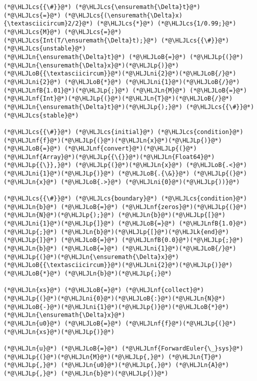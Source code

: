 \documentclass[12pt,a4paper]{article}
\newcommand{\HLJLk}[1]{\textcolor[RGB]{148,91,176}{\textbf{#1}}}
\newcommand{\HLJLn}[1]{#1}
\newcommand{\HLJLnf}[1]{\textcolor[RGB]{66,102,213}{#1}}
\newcommand{\HLJLnfB}[1]{\textcolor[RGB]{59,151,46}{#1}}
\newcommand{\HLJLni}[1]{\textcolor[RGB]{59,151,46}{#1}}
\newcommand{\HLJLoB}[1]{\textcolor[RGB]{102,102,102}{\textbf{#1}}}
\newcommand{\HLJLp}[1]{#1}
\newcommand{\HLJLcs}[1]{\textcolor[RGB]{153,153,119}{\textit{#1}}}
\begin{document}
\begin{lstlisting}
(*@\HLJLcs{{\#}}@*) (*@\HLJLcs{\ensuremath{\Delta}t}@*) (*@\HLJLcs{=}@*) (*@\HLJLcs{(\ensuremath{\Delta}x){\textasciicircum}2/2}@*) (*@\HLJLcs{*}@*) (*@\HLJLcs{1/0.99;}@*) (*@\HLJLcs{M}@*) (*@\HLJLcs{=}@*) (*@\HLJLcs{Int(T/\ensuremath{\Delta}t);}@*) (*@\HLJLcs{{\#}}@*) (*@\HLJLcs{unstable}@*)
(*@\HLJLn{\ensuremath{\Delta}t}@*) (*@\HLJLoB{=}@*) (*@\HLJLp{(}@*)(*@\HLJLn{\ensuremath{\Delta}x}@*)(*@\HLJLp{)}@*)(*@\HLJLoB{{\textasciicircum}}@*)(*@\HLJLni{2}@*)(*@\HLJLoB{/}@*)(*@\HLJLni{2}@*) (*@\HLJLoB{*}@*) (*@\HLJLni{1}@*)(*@\HLJLoB{/}@*)(*@\HLJLnfB{1.01}@*)(*@\HLJLp{;}@*) (*@\HLJLn{M}@*) (*@\HLJLoB{=}@*) (*@\HLJLnf{Int}@*)(*@\HLJLp{(}@*)(*@\HLJLn{T}@*)(*@\HLJLoB{/}@*)(*@\HLJLn{\ensuremath{\Delta}t}@*)(*@\HLJLp{);}@*) (*@\HLJLcs{{\#}}@*) (*@\HLJLcs{stable}@*)

(*@\HLJLcs{{\#}}@*) (*@\HLJLcs{initial}@*) (*@\HLJLcs{condition}@*)
(*@\HLJLnf{f}@*)(*@\HLJLp{(}@*)(*@\HLJLn{x}@*)(*@\HLJLp{)}@*) (*@\HLJLoB{=}@*) (*@\HLJLnf{convert}@*)(*@\HLJLp{(}@*)(*@\HLJLnf{Array}@*)(*@\HLJLp{{\{}}@*)(*@\HLJLn{Float64}@*)(*@\HLJLp{{\}},}@*) (*@\HLJLp{(}@*)(*@\HLJLn{x}@*) (*@\HLJLoB{.<}@*) (*@\HLJLni{1}@*)(*@\HLJLp{)}@*) (*@\HLJLoB{.{\&}}@*) (*@\HLJLp{(}@*)(*@\HLJLn{x}@*) (*@\HLJLoB{.>}@*) (*@\HLJLni{0}@*)(*@\HLJLp{))}@*)

(*@\HLJLcs{{\#}}@*) (*@\HLJLcs{boundary}@*) (*@\HLJLcs{condition}@*)
(*@\HLJLn{b}@*) (*@\HLJLoB{=}@*) (*@\HLJLnf{zeros}@*)(*@\HLJLp{(}@*)(*@\HLJLn{N}@*)(*@\HLJLp{);}@*) (*@\HLJLn{b}@*)(*@\HLJLp{[}@*)(*@\HLJLni{1}@*)(*@\HLJLp{]}@*) (*@\HLJLoB{=}@*) (*@\HLJLnfB{1.0}@*)(*@\HLJLp{;}@*) (*@\HLJLn{b}@*)(*@\HLJLp{[}@*)(*@\HLJLk{end}@*)(*@\HLJLp{]}@*) (*@\HLJLoB{=}@*) (*@\HLJLnfB{0.0}@*)(*@\HLJLp{;}@*) (*@\HLJLn{b}@*) (*@\HLJLoB{=}@*) (*@\HLJLni{1}@*)(*@\HLJLoB{/}@*)(*@\HLJLp{(}@*)(*@\HLJLn{\ensuremath{\Delta}x}@*)(*@\HLJLoB{{\textasciicircum}}@*)(*@\HLJLni{2}@*)(*@\HLJLp{)}@*) (*@\HLJLoB{*}@*) (*@\HLJLn{b}@*)(*@\HLJLp{;}@*)

(*@\HLJLn{xs}@*) (*@\HLJLoB{=}@*) (*@\HLJLnf{collect}@*)(*@\HLJLp{(}@*)(*@\HLJLni{0}@*)(*@\HLJLoB{:}@*)(*@\HLJLn{N}@*)(*@\HLJLoB{-}@*)(*@\HLJLni{1}@*)(*@\HLJLp{)}@*)(*@\HLJLoB{*}@*)(*@\HLJLn{\ensuremath{\Delta}x}@*)
(*@\HLJLn{u0}@*) (*@\HLJLoB{=}@*) (*@\HLJLnf{f}@*)(*@\HLJLp{(}@*)(*@\HLJLn{xs}@*)(*@\HLJLp{)}@*)

(*@\HLJLn{u}@*) (*@\HLJLoB{=}@*) (*@\HLJLnf{ForwardEuler{\_}sys}@*)(*@\HLJLp{(}@*)(*@\HLJLn{M}@*)(*@\HLJLp{,}@*) (*@\HLJLn{T}@*)(*@\HLJLp{,}@*) (*@\HLJLn{u0}@*)(*@\HLJLp{,}@*) (*@\HLJLn{A}@*)(*@\HLJLp{,}@*) (*@\HLJLn{b}@*)(*@\HLJLp{)}@*)


\end{lstlisting}
\end{document}

